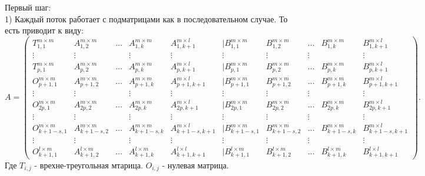\documentclass[a4paper,12pt]{article}
\begin{document}
{\fontsize{14}{14}\selectfont Первый шаг:}\\

1) Каждый поток работает с подматрицами как в последовательном случае. То есть приводит к виду:
\begin{equation*}
A = 
\begin{pmatrix}
T_{1,1}^{m \times m} & A_{1,2}^{m \times m} & \dots & A_{1,k}^{m \times m} & A_{1,k+1}^{m \times l} & | B_{1,1}^{m \times m} & B_{1,2}^{m \times m} & \dots & B_{1,k}^{m\times m} & B_{1,k+1}^{m \times l}\\
\vdots & \vdots &  & \vdots & \vdots &\vdots  &\vdots   &\vdots  & \  &\vdots \\
T_{p,1}^{m \times m} & A_{p,2}^{m \times m} & \dots & A_{p,k}^{m \times m} & A_{p,k+1}^{m \times l}& | B_{p,1}^{m \times m} & B_{p,2}^{m \times m} & \dots & B_{p,k}^{m\times m} & B_{p,k+1}^{m \times l}\\
\hline
O_{p+1,1}^{m \times m} & A_{p+1,2}^{m \times m} & \dots & A_{p+1,k}^{m \times m} & A_{p+1,k+1}^{m \times l} & | B_{p+1,1}^{m \times m} & B_{p+1,2}^{m \times m} & \dots & B_{p+1,k}^{m\times m} & B_{p+1,k+1}^{m \times l}\\
\vdots & \vdots &  & \vdots & \vdots &\vdots  &\vdots   &\vdots  & \  &\vdots \\O_{2p,1}^{m \times m} & A_{2p,2}^{m \times m} & \dots & A_{2p,k}^{m \times m} & A_{2p,k+1}^{m \times l} & | B_{2p,1}^{m \times m} & B_{2p,2}^{m \times m} & \dots & B_{2p,k}^{m\times m} & B_{2p,k+1}^{m \times l}\\
\hline
\vdots & \vdots &  & \vdots & \vdots &\vdots  &\vdots   &\vdots  & \  &\vdots \\\hline
O_{k+1-s,1}^{m \times m} & A_{k+1-s,2}^{m \times m} & \dots & A_{k+1-s,k}^{m \times m} & A_{k+1-s,k+1}^{m \times l} & | B_{k+1-s,1}^{m \times m} & B_{k+1-s,2}^{m \times m} & \dots & B_{k+1-s,k}^{m\times m} & B_{k+1-s,k+1}^{m \times l}\\
\vdots & \vdots &  & \vdots & \vdots &\vdots  &\vdots   &\vdots  & \  &\vdots \\
O_{k+1,1}^{l \times m} & A_{k+1,2}^{l \times m} & \dots & A_{k+1,k}^{l \times m} & A_{k+1,k+1}^{l \times l} & | B_{k+1,1}^{l \times m} & B_{k+1,2}^{l \times m} & \dots & B_{k+1,k}^{l\times m} & B_{k+1,k+1}^{l \times l}
\end{pmatrix}.
\end{equation*}
Где $T_{i,j}$ - врехне-треугольная мтарица. $O_{i,j}$ - нулевая матрица.\\
\end{document}
